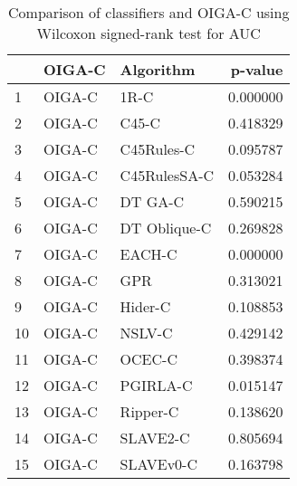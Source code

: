 \begin{table}
\footnotesize
\caption{Comparison of classifiers and OIGA-C using Wilcoxon signed-rank test for AUC}
\label{tab:OIGA-C wilcoxon AUC comparison}
\begin{tabular}{lllr}
\hline
 & OIGA-C & Algorithm & p-value \\
\hline
1 & OIGA-C & 1R-C & 0.000000 \\
2 & OIGA-C & C45-C & 0.418329 \\
3 & OIGA-C & C45Rules-C & 0.095787 \\
4 & OIGA-C & C45RulesSA-C & 0.053284 \\
5 & OIGA-C & DT GA-C & 0.590215 \\
6 & OIGA-C & DT Oblique-C & 0.269828 \\
7 & OIGA-C & EACH-C & 0.000000 \\
8 & OIGA-C & GPR & 0.313021 \\
9 & OIGA-C & Hider-C & 0.108853 \\
10 & OIGA-C & NSLV-C & 0.429142 \\
11 & OIGA-C & OCEC-C & 0.398374 \\
12 & OIGA-C & PGIRLA-C & 0.015147 \\
13 & OIGA-C & Ripper-C & 0.138620 \\
14 & OIGA-C & SLAVE2-C & 0.805694 \\
15 & OIGA-C & SLAVEv0-C & 0.163798 \\
\hline
\end{tabular}
\end{table}
